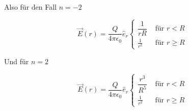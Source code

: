 \documentclass[a4paper,german,12pt,smallheadings]{scrartcl}
\begin{document}
\begin{enumerate}[a)]
    Also für den Fall $n = -2$

    \begin{equation}
      \vec{E}(r) = \dfrac{Q}{4 \pi \epsilon_0} \hat{e}_r \begin{cases}
        \dfrac{1}{rR} & \text{ für } r < R \\
        \frac{1}{r^2} & \text{ für } r \ge R
      \end{cases}
    \end{equation}

    Und für $n = 2$

    \begin{equation}
      \vec{E}(r) = \dfrac{Q}{4 \pi \epsilon_0} \hat{e}_r \begin{cases}
        \dfrac{r^3}{R^5} & \text{ für } r < R \\
        \frac{1}{r^2} & \text{ für } r \ge R
      \end{cases}
    \end{equation}

\end{enumerate}
\end{document}
